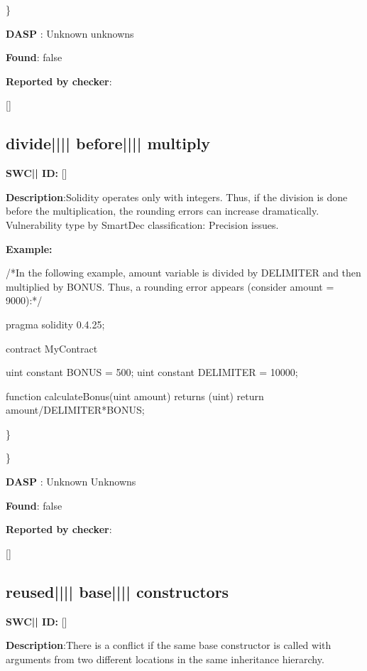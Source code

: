 \documentclass{article}
\begin{document}
\} 

\textbf{DASP} : Unknown unknowns

\textbf{Found}: false

\textbf{Reported by checker}: 
\begin{ffcode} 

[]
\end{ffcode} 
\subsection{divide{||\textunderscore|| }before{||\textunderscore|| }multiply} 
\textbf{SWC{|\textunderscore| }ID:} []

\textbf{Description}:Solidity operates only with integers. Thus, if the division is done before the multiplication, the rounding errors can increase dramatically. Vulnerability type by SmartDec classification: Precision issues.


\textbf{Example:} 
\begin{ffcode} 

/*In the following example, amount variable is divided by DELIMITER and then multiplied by BONUS. Thus, a rounding error appears (consider amount = 9000):*/ 

pragma solidity 0.4.25;

contract MyContract {

    uint constant BONUS = 500;
    uint constant DELIMITER = 10000;

    function calculateBonus(uint amount) returns (uint) {
        return amount/DELIMITER*BONUS;
    }
}

\end{ffcode} 
\} 

\} 

\textbf{DASP} : Unknown Unknowns

\textbf{Found}: false

\textbf{Reported by checker}: 
\begin{ffcode} 

[]
\end{ffcode} 
\subsection{reused{||\textunderscore|| }base{||\textunderscore|| }constructors} 
\textbf{SWC{|\textunderscore| }ID:} []

\textbf{Description}:There is a conflict if the same base constructor is called with arguments from two different locations in the same inheritance hierarchy.
\end{document}
